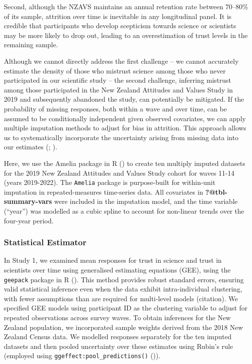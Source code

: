 \documentclass[
  single column]{article}
\begin{document}
Second, although the NZAVS maintains an annual retention rate between
70--80\% of its sample, attrition over time is inevitable in any
longitudinal panel. It is credible that participants who develop
scepticism towards science or scientists may be more likely to drop out,
leading to an overestimation of trust levels in the remaining sample.

Although we cannot directly address the first challenge -- we cannot
accurately estimate the density of those who mistrust science among
those who never participated in our scientific study -- the second
challenge, inferring mistrust among those participated in the New
Zealand Attitudes and Values Study in 2019 and subsequently abandoned
the study, can potentially be mitigated. If the probability of missing
responses, both within a wave and over time, can be assumed to be
conditionally independent given observed covariates, we can apply
multiple imputation methods to adjust for bias in attrition. This
approach allows us to systematically incorporate the uncertainty arising
from missing data into our estimates
(;
).

Here, we use the Amelia package in R () to create ten multiply imputed datasets for the
2019 New Zealand Attitudes and Values Study cohort for waves 11-14
(years 2019-2022). The \texttt{Amelia} package is purpose-built for
within-unit imputation in repeated-measures time-series data. All
covariates in \textbf{?@tbl-summary-vars} were included in the
imputation model, and the time variable (``year'') was modelled as a
cubic spline to account for non-linear trends over the four-year period.

\subsubsection{Statistical Estimator}\label{statistical-estimator}

In Study 1, we examined mean responses for trust in science and trust in
scientists over time using generalised estimating equations (GEE), using
the \texttt{geepack} package in R (). This method provides robust standard errors,
ensuring valid statistical inference even when the data exhibit
intra-individual clustering, with fewer assumptions than are required
for multi-level models (citation). We specified GEE models using
participant ID as the clustering variable to adjust for repeated
observations across survey waves. To obtain inferences for the New
Zealand population, we incorporated sample weights derived from the 2018
New Zealand Census data. We modelled responses separately for the ten
imputed datasets and then pooled uncertainty over these estimates using
Rubin's rule (employed using \texttt{ggeffect:pool\_predictions()}
()).
\end{document}
